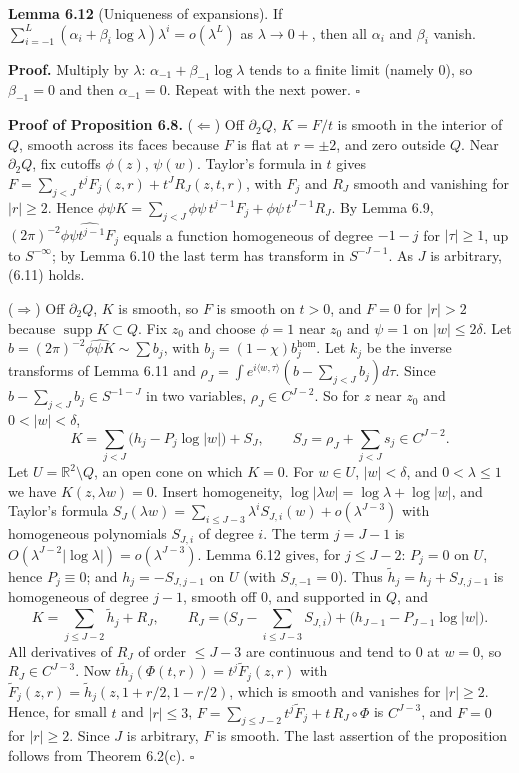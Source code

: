 \documentclass[
  11pt,
]{article}
\begin{document}
\textbf{Lemma 6.12} (Uniqueness of expansions). If
\(\sum_{i=-1}^L(\alpha_i+\beta_i\log\lambda)\lambda^i=o(\lambda^L)\) as
\(\lambda\to0+\), then all \(\alpha_i\) and \(\beta_i\) vanish.

\textbf{Proof.} Multiply by \(\lambda\):
\(\alpha_{-1}+\beta_{-1}\log\lambda\) tends to a finite limit (namely
0), so \(\beta_{-1}=0\) and then \(\alpha_{-1}=0\). Repeat with the next
power. \(\square\)

\textbf{Proof of Proposition 6.8.} (\(\Leftarrow\)) Off \(\partial_2Q\),
\(K=F/t\) is smooth in the interior of \(Q\), smooth across its faces
because \(F\) is flat at \(r=\pm2\), and zero outside \(Q\). Near
\(\partial_2Q\), fix cutoffs \(\phi(z)\), \(\psi(w)\). Taylor's formula
in \(t\) gives \(F=\sum_{j<J}t^jF_j(z,r)+t^JR_J(z,t,r)\), with \(F_j\)
and \(R_J\) smooth and vanishing for \(|r|\geq2\). Hence
\(\phi\psi K=\sum_{j<J}\phi\psi\,t^{j-1}F_j+\phi\psi\,t^{J-1}R_J\). By
Lemma 6.9, \((2\pi)^{-2}\widehat{\phi\psi t^{j-1}F_j}\) equals a
function homogeneous of degree \(-1-j\) for \(|\tau|\geq1\), up to
\(S^{-\infty}\); by Lemma 6.10 the last term has transform in
\(S^{-J-1}\). As \(J\) is arbitrary, (6.11) holds.

(\(\Rightarrow\)) Off \(\partial_2Q\), \(K\) is smooth, so \(F\) is
smooth on \(t>0\), and \(F=0\) for \(|r|>2\) because
\(\operatorname{supp}K\subset Q\). Fix \(z_0\) and choose \(\phi=1\)
near \(z_0\) and \(\psi=1\) on \(|w|\leq2\delta\). Let
\(b=(2\pi)^{-2}\widehat{\phi\psi K}\sim\sum b_j\), with
\(b_j=(1-\chi)b_j^{\mathrm{hom}}\). Let \(k_j\) be the inverse
transforms of Lemma 6.11 and
\(\rho_J=\int e^{i\langle w,\tau\rangle}(b-\sum_{j<J}b_j)d\tau\). Since
\(b-\sum_{j<J}b_j\in S^{-1-J}\) in two variables, \(\rho_J\in C^{J-2}\).
So for \(z\) near \(z_0\) and \(0<|w|<\delta\), \[
K=\sum_{j<J}\big(h_j-P_j\log|w|\big)+S_J,\qquad S_J=\rho_J+\sum_{j<J}s_j\in C^{J-2}.
\] Let \(U=\mathbb R^2\setminus Q\), an open cone on which \(K=0\). For
\(w\in U\), \(|w|<\delta\), and \(0<\lambda\leq1\) we have
\(K(z,\lambda w)=0\). Insert homogeneity,
\(\log|\lambda w|=\log\lambda+\log|w|\), and Taylor's formula
\(S_J(\lambda w)=\sum_{i\leq J-3}\lambda^iS_{J,i}(w)+o(\lambda^{J-3})\)
with homogeneous polynomials \(S_{J,i}\) of degree \(i\). The term
\(j=J-1\) is \(O(\lambda^{J-2}|\log\lambda|)=o(\lambda^{J-3})\). Lemma
6.12 gives, for \(j\leq J-2\): \(P_j=0\) on \(U\), hence \(P_j\equiv0\);
and \(h_j=-S_{J,j-1}\) on \(U\) (with \(S_{J,-1}=0\)). Thus
\(\tilde h_j=h_j+S_{J,j-1}\) is homogeneous of degree \(j-1\), smooth
off 0, and supported in \(Q\), and \[
K=\sum_{j\leq J-2}\tilde h_j+R_J,\qquad R_J=\Big(S_J-\sum_{i\leq J-3}S_{J,i}\Big)+\big(h_{J-1}-P_{J-1}\log|w|\big).
\] All derivatives of \(R_J\) of order \(\leq J-3\) are continuous and
tend to 0 at \(w=0\), so \(R_J\in C^{J-3}\). Now
\(t\tilde h_j(\Phi(t,r))=t^j\tilde F_j(z,r)\) with
\(\tilde F_j(z,r)=\tilde h_j(z,1+r/2,1-r/2)\), which is smooth and
vanishes for \(|r|\geq2\). Hence, for small \(t\) and \(|r|\leq3\),
\(F=\sum_{j\leq J-2}t^j\tilde F_j+t\,R_J\circ\Phi\) is \(C^{J-3}\), and
\(F=0\) for \(|r|\geq2\). Since \(J\) is arbitrary, \(F\) is smooth. The
last assertion of the proposition follows from Theorem 6.2(c).
\(\square\)
\end{document}
